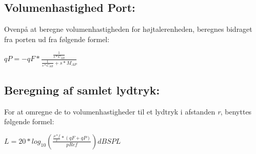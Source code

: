 \subsection{Volumenhastighed Port:}

Ovenpå at beregne volumenhastigheden for højtalerenheden, beregnes bidraget fra porten ud fra følgende formel:

{\Large\(qP=-qF*\)}{\huge \(\frac{\frac{1}{s*C_{AB}}}{\frac{1}{s*C_{AB}}+s*M_{AP}}\) }


\subsection{Beregning af samlet lydtryk:}

For at omregne de to volumenhastigheder til et lydtryk i afstanden \textit{r}, benyttes følgende formel:

\(L=20*log_{10}(\frac{\frac{\rho*f}{r}*(qF+qP)}{pRef}) dB SPL\)
